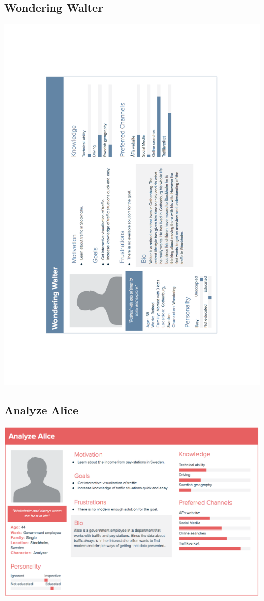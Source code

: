\documentclass[12pt]{kththesis}
\begin{document}
\begin{appendices}
\subsection{Wondering Walter}
\includegraphics[width=1\textwidth]{WonderingWalter}
\newpage
\subsection{Analyze Alice}
\includegraphics[width=1\textwidth]{AnalyzeAlice}


\end{appendices}
\end{document}
